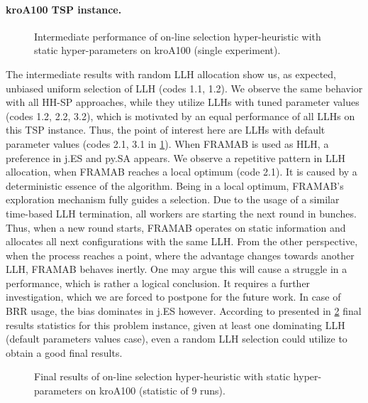 \paragraph{kroA100 TSP instance.}
\begin{figure}[t]
	\centering
	\vspace{-20pt}
	
	\caption{Intermediate performance of on-line selection hyper-heuristic with static hyper-parameters on kroA100 (single experiment).}
	\vspace{-10pt}
	\label{eval:pict:hh-sp:kroA100 intermediate}
\end{figure}
The intermediate results with random LLH allocation show us, as expected, unbiased uniform selection of LLH (codes 1.1, 1.2). We observe the same behavior with all HH-SP approaches, while they utilize LLHs with tuned parameter values (codes 1.2, 2.2, 3.2), which is motivated by an equal performance of all LLHs on this TSP instance. Thus, the point of interest here are LLHs with default parameter values (codes 2.1, 3.1 in \cref{eval:pict:hh-sp:kroA100 intermediate}). When FRAMAB is used as HLH, a preference in j.ES and py.SA appears. We observe a repetitive pattern in LLH allocation, when FRAMAB reaches a local optimum (code 2.1). It is caused by a deterministic essence of the algorithm. Being in a local optimum, FRAMAB's exploration mechanism fully guides a selection. Due to the usage of a similar time-based LLH termination, all workers are starting the next round in bunches. Thus, when a new round starts, FRAMAB operates on static information and allocates all next configurations with the same LLH. From the other perspective, when the process reaches a point, where the advantage changes towards another LLH, FRAMAB behaves inertly. One may argue this will cause a struggle in a performance, which is rather a logical conclusion. It requires a further investigation, which we are forced to postpone for the future work. In case of BRR usage, the bias dominates in j.ES however. According to presented in \cref{eval:pict:hh-sp:kroA100 final} final results statistics for this problem instance, given at least one dominating LLH (default parameters values case), even a random LLH selection could utilize to obtain a good final results.

\begin{figure}[b]
	\centering
	\vspace{-20pt}
	
	\caption{Final results of on-line selection hyper-heuristic with static hyper-parameters on kroA100 (statistic of 9 runs).}
	\vspace{-5pt}
	\label{eval:pict:hh-sp:kroA100 final}
\end{figure}

